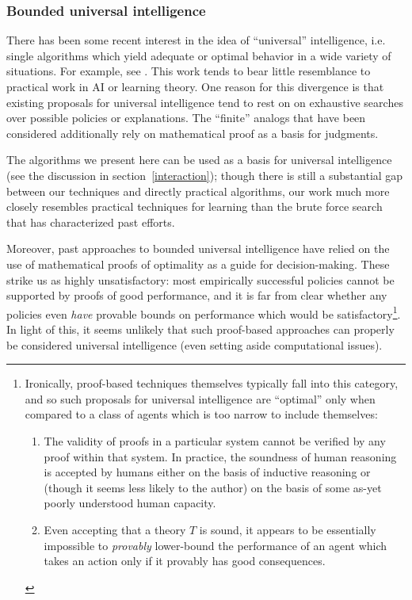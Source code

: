 \documentclass[12pt]{article}
\theoremstyle{definition}
\begin{document}
\subsubsection{Bounded universal intelligence}\label{universal-intelligence}

There has been some recent interest in the idea of ``universal'' intelligence,
i.e. single algorithms which yield adequate or optimal behavior
in a wide variety of situations.
For example, see \cite{aixi, godel-machine}.
This work tends to bear little resemblance to practical work in AI
or learning theory.
One reason for this divergence is that existing proposals for universal
intelligence tend to rest on
on exhaustive searches over possible policies or explanations.
The ``finite'' analogs that have been considered additionally
rely on mathematical proof as a basis for judgments.

The algorithms we present here can be used as a basis for universal
intelligence (see the discussion in section~\ref{interaction});
though there is still a substantial gap between our techniques
and directly practical algorithms,
our work much more closely resembles practical techniques for learning than
the brute force search that has characterized past efforts.

Moreover, past approaches to bounded universal intelligence
have relied on the use of mathematical proofs of optimality
as a guide for decision-making.
These strike us as highly unsatisfactory:
most empirically successful policies cannot be supported by proofs
of good performance, and it is far from clear
whether any policies even \emph{have} provable bounds on performance
which would be satisfactory\footnote{Ironically,
proof-based techniques themselves typically fall into this category,
and so such proposals for universal intelligence
are ``optimal'' only when compared
to a class of agents which is too narrow to include themselves:
\begin{enumerate}
\item The validity of proofs in a particular system
cannot be verified by any proof within that system.
In practice, the soundness of human reasoning
is accepted by humans either on the basis of inductive
reasoning
or (though it seems less likely to the author) on the basis of some 
as-yet poorly understood human capacity.
\item Even accepting that a theory $T$ is sound,
it appears to be essentially impossible to \emph{provably} lower-bound the performance
of an agent which takes an action only if it provably
has good consequences.
\end{enumerate}
}. In light of this, it seems unlikely that such proof-based
approaches can properly be considered universal intelligence
(even setting aside computational issues).
\end{document}
